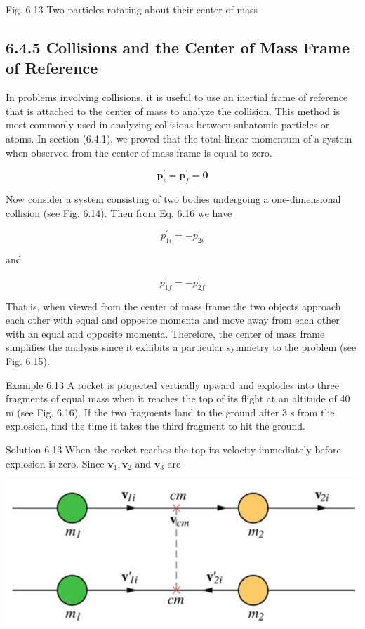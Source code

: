 \documentclass[10pt]{article}
\begin{document}
Fig. 6.13 Two particles rotating about their center of mass

\subsection*{6.4.5 Collisions and the Center of Mass Frame of Reference}
In problems involving collisions, it is useful to use an inertial frame of reference that is attached to the center of mass to analyze the collision. This method is most commonly used in analyzing collisions between subatomic particles or atoms. In section (6.4.1), we proved that the total linear momentum of a system when observed from the center of mass frame is equal to zero.


\begin{equation*}
\mathbf{p}_{i}^{\prime}=\mathbf{p}_{f}^{\prime}=\mathbf{0} \tag{6.16}
\end{equation*}


Now consider a system consisting of two bodies undergoing a one-dimensional collision (see Fig. 6.14). Then from Eq. 6.16 we have

$$
p_{1 i}^{\prime}=-p_{2 i}^{\prime}
$$

and

$$
p_{1 f}^{\prime}=-p_{2 f}^{\prime}
$$

That is, when viewed from the center of mass frame the two objects approach each other with equal and opposite momenta and move away from each other with an equal and opposite momenta. Therefore, the center of mass frame simplifies the analysis since it exhibits a particular symmetry to the problem (see Fig. 6.15).

Example 6.13 A rocket is projected vertically upward and explodes into three fragments of equal mass when it reaches the top of its flight at an altitude of 40 m (see Fig. 6.16). If the two fragments land to the ground after 3 s from the explosion, find the time it takes the third fragment to hit the ground.

Solution 6.13 When the rocket reaches the top its velocity immediately before explosion is zero. Since $\mathbf{v}_{1}, \mathbf{v}_{2}$ and $\mathbf{v}_{3}$ are

\begin{center}
\includegraphics[max width=\textwidth]{2024_09_13_db1f357d2aad0a03eb2eg-107(3)}
\end{center}
\end{document}
